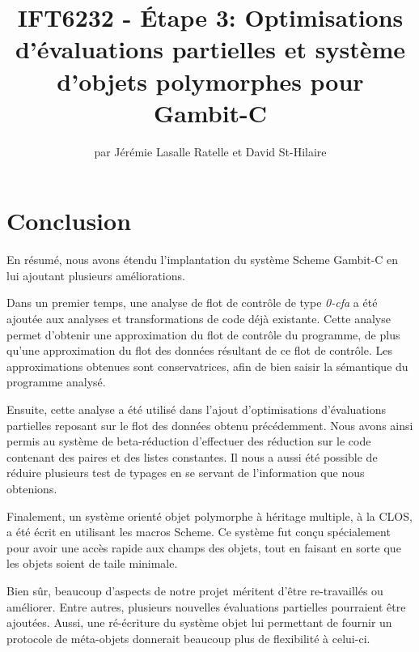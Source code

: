 \documentclass[letterpaper,12pt]{book}
\begin{document}
\title{IFT6232 - Étape 3: Optimisations d'évaluations partielles et
  système d'objets polymorphes pour Gambit-C}

\author{par Jérémie Lasalle Ratelle et David St-Hilaire}
\maketitle


\tableofcontents








\chapter{Conclusion}
  
  En résumé, nous avons étendu l'implantation du système Scheme
  Gambit-C en lui ajoutant plusieurs améliorations. 

  Dans un premier temps, une analyse de flot de contrôle de type
  \textit{0-cfa} a été ajoutée aux analyses et transformations de code
  déjà existante. Cette analyse permet d'obtenir une approximation du
  flot de contrôle du programme, de plus qu'une approximation du flot
  des données résultant de ce flot de contrôle. Les approximations
  obtenues sont conservatrices, afin de bien saisir la sémantique du
  programme analysé.

  Ensuite, cette analyse a été utilisé dans l'ajout d'optimisations
  d'évaluations partielles reposant sur le flot des données obtenu
  précédemment. Nous avons ainsi permis au système de beta-réduction
  d'effectuer des réduction sur le code contenant des paires et des
  listes constantes. Il nous a aussi été possible de réduire plusieurs
  test de typages en se servant de l'information que nous obtenions.

  Finalement, un système orienté objet polymorphe à héritage multiple,
  à la CLOS, a été écrit en utilisant les macros Scheme. Ce système
  fut conçu spécialement pour avoir une accès rapide aux champs des
  objets, tout en faisant en sorte que les objets soient de taile
  minimale. 

  Bien sûr, beaucoup d'aspects de notre projet méritent d'être
  re-travaillés ou améliorer. Entre autres, plusieurs nouvelles
  évaluations partielles pourraient être ajoutées. Aussi, une
  ré-écriture du système objet lui permettant de fournir un protocole
  de méta-objets donnerait beaucoup plus de flexibilité à celui-ci.
\end{document}
